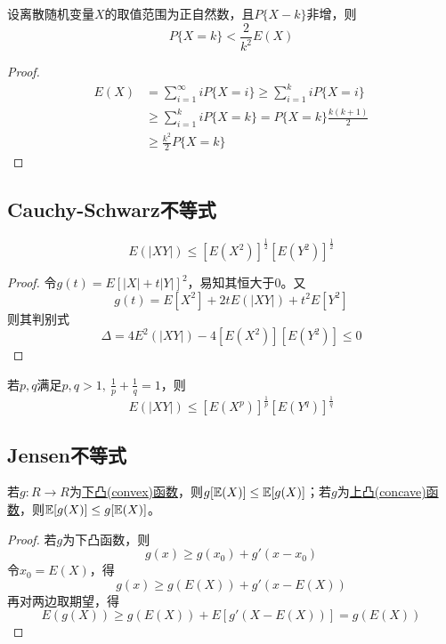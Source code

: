 \begin{proposition}[Chebyshev不等式的离散情形]
    设离散随机变量$X$的取值范围为正自然数，且$P\{ X-k \}$非增，则
    \[ P\{ X=k \} < \frac{2}{k^2}E(X) \]
\end{proposition}
\begin{proof}
    \begin{align*}
        E(X) & =\sum_{i=1}^{\infty}i P\{ X=i \} \ge \sum_{i=1}^{k}i P\{ X=i \}                      \\
             & \ge \sum_{i=1}^{k}i P\{ X=k \} = P\{ X=k \} \frac{k(k+1)}{2} \\
             & \ge \frac{k^2}{2}P\{ X=k \}
    \end{align*}
\end{proof}

\subsection{Cauchy-Schwarz不等式}

\begin{proposition}
    \[ E(|XY|) \le [E(X^2)]^{\frac{1}{2}} [E(Y^2)]^{\frac{1}{2}} \]
\end{proposition}
\begin{proof}
    令$g(t)=E[|X|+t|Y|]^2$，易知其恒大于$0$。又
    \[ g(t)=E[X^2]+2tE(|XY|)+ t^2E[Y^2] \]
    则其判别式
    \[ \Delta = 4E^2(|XY|)-4[E(X^2)] [E(Y^2)] \le 0 \]
\end{proof}

\begin{proposition}[Holder不等式]
    若$p,q$满足$p,q>1,\ \frac{1}{p}+\frac{1}{q}=1 $，则
    \[ E(|XY|) \le [E(X^p)]^{\frac{1}{p}} [E(Y^q)]^{\frac{1}{q}} \]
\end{proposition}

\subsection{Jensen不等式}

\begin{theorem}[Jensen不等式]
    若$g:R \to R$为\underline{下凸(convex)函数}，则$g[\mathbb{E}(X)] \le \mathbb{E}[g(X)]$；若$g$为\underline{上凸(concave)函数}，则$\mathbb{E}[g(X)] \le g[\mathbb{E}(X)]$。
\end{theorem}
\begin{proof}
    若$g$为下凸函数，则
    \[ g(x)\ge g(x_0)+g'(x-x_0) \]
    令$x_0=E(X)$，得
    \[ g(x)\ge g(E(X))+g'(x-E(X)) \]
    再对两边取期望，得
    \[ E(g(X))\ge g(E(X))+E[g'(X-E(X))]=g(E(X)) \]
\end{proof}

